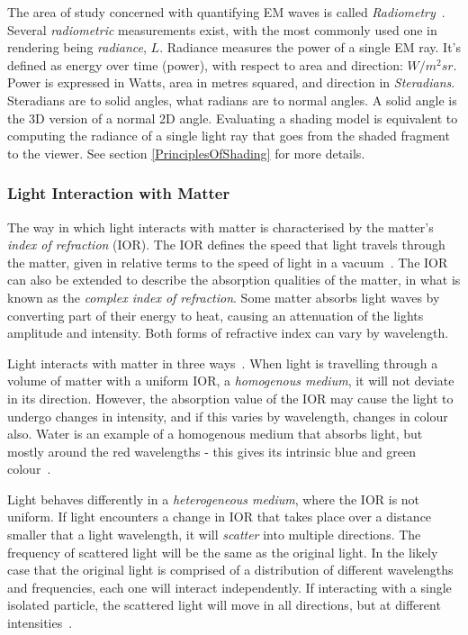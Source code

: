 The area of study concerned with quantifying EM waves is called \textit{Radiometry}~\cite{IntroToRadiometry}. Several \textit{radiometric} measurements exist, with the most commonly used one in rendering being \textit{radiance}, \begin{math}L\end{math}. Radiance measures the power of a single EM ray. It's defined as energy over time (power), with respect to area and direction: \begin{math}W/m^2sr\end{math}. Power is expressed in Watts, area in metres squared, and direction in \textit{Steradians}. Steradians are to solid angles, what radians are to normal angles. A solid angle is the 3D version of a normal 2D angle. Evaluating a shading model is equivalent to computing the radiance of a single light ray that goes from the shaded fragment to the viewer. See section \ref{PrinciplesOfShading} for more details.

\subsubsection{Light Interaction with Matter}

The way in which light interacts with matter is characterised by the matter's \textit{index of refraction} (IOR). The IOR defines the speed that light travels through the matter, given in relative terms to the speed of light in a vacuum~\cite{HowLightInteractsWithMatter}. The IOR can also be extended to describe the absorption qualities of the matter, in what is known as the \textit{complex index of refraction}. Some matter absorbs light waves by converting part of their energy to heat, causing an attenuation of the lights amplitude and intensity. Both forms of refractive index can vary by wavelength.

Light interacts with matter in three ways~\cite{HoffmanPBSBackground}. When light is travelling through a volume of matter with a uniform IOR, a \textit{homogenous medium}, it will not deviate in its direction. However, the absorption value of the IOR may cause the light to undergo changes in intensity, and if this varies by wavelength, changes in colour also. Water is an example of a homogenous medium that absorbs light, but mostly around the red wavelengths - this gives its intrinsic blue and green colour~\cite{HowLightInteractsWithMatter}.

Light behaves differently in a \textit{heterogeneous medium}, where the IOR is not uniform. If light encounters a change in IOR that takes place over a distance smaller that a light wavelength, it will \textit{scatter} into multiple directions. The frequency of scattered light will be the same as the original light. In the likely case that the original light is comprised of a distribution of different wavelengths and frequencies, each one will interact independently. If interacting with a single isolated particle, the scattered light will move in all directions, but at different intensities~\cite{RTR4}.

